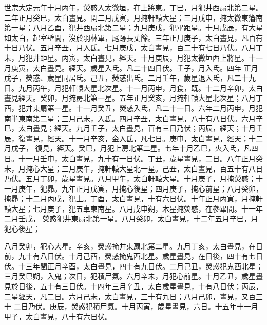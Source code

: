 \begin{pinyinscope}
 世宗大定元年十月丙午，熒惑入太微垣，在上將東。丁巳，月犯井西扇北第二星。二年正月癸巳，太白晝見。閏二月戊寅，月掩軒轅大星；三月戊申，掩太微東籓南第一星；八月乙酉，犯井西扇北第二星；九月庚戌，犯畢距星。十月戊辰，有大星如太白，起室壁間，沒於羽林軍，尾跡長丈餘。三年正月庚子，太白晝見，凡百有十日乃伏。五月辛丑，月入氐。七月庚戌，太白晝見，百二十有七日乃伏。八月丁未，月犯井距星。丙寅，太白晝見，經天。十月庚辰，月犯太微垣西上將星。十一月庚寅，太白晝見。經天。歲星入氐。凡二十四日伏。壬子，月入氐。四年
 正月戊子，熒惑、歲星同居氐。己丑，熒惑出氐。二月壬午，歲星退入氐，凡二十九日。九月丙午，月犯軒轅大星北次星。十一月丙申，月食，既。十二月辛卯，太白晝見經天。癸卯，月掩房北第一星。五年正月癸亥，月掩軒轅大星北次星；八月丁酉，犯井東扇第一星。十一月癸丑，熒惑入氐，凡二十一日。六年二月丙申，月犯南半東南第二星；三月己未，入氐。四月辛丑，太白晝見，八十有八日伏。六月辛巳，太白晝見；經天。九月壬子，太白晝見，百有三日乃伏；丙辰，經天；十月壬辰，復晝見，經天。十一月辛亥，金入氐，凡七日。庚申，太白晝見，經天；十二月戊子，
 復見，經天。癸巳，月犯上房北第二星。七年十月乙巳，火入氐，凡四日。十一月壬申，太白晝見，九十有一日伏。丁丑，歲星晝見，二日。八年正月癸未，月掩心大星；三月庚午，掩軒轅大星北一星。己丑，太白晝見，百五十有八日乃伏。五月丁卯，歲星晝見。八月甲午，太白軒轅大星。十月庚子，月掩熒惑；十一月庚午，犯昴。九年正月戊寅，月掩心後星；四月庚子，掩心前星；八月癸卯，掩昴；十二月丙戌，犯土。丁酉，太白晝見，十有六日伏。十年正月丙寅，月掩軒轅大星；七月庚子，犯五車東南星。八月戊申朔，木星掩熒惑，在參畢間。十一年二月壬戌，
 熒惑犯井東扇北第一星。八月癸卯，太白晝見，十二年五月辛巳，月犯心後星；



 八月癸卯，犯心大星。辛亥，熒惑掩井東扇北第二星。九月丁亥，太白晝見，在日前，九十有八日伏。十月己酉，熒惑掩鬼西北星。歲星晝見，在日後，四十有七日伏。十三年閏正月辛酉，太白晝見，四十有九日伏。二月己丑，熒惑犯鬼西北星；三月癸巳朔，入鬼；次日，犯積尸氣。六月辛未，月犯心前星。十月乙丑，歲星晝見於日後，五十有三日伏。十四年三月辛丑，太白歲星晝見，十有八日伏；丙辰，二星經天，凡二日。六月己未，太白晝見，三十有九日；八月己卯，晝見，又百三十
 二日乃伏。庚辰，熒惑犯積尸氣。十月丙寅，歲星晝見，六日。十五年十一月甲子，太白晝見，八十有六日伏。




\end{pinyinscope}
